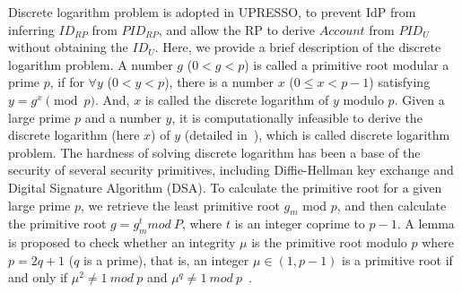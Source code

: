 Discrete logarithm problem is adopted in UPRESSO, to prevent IdP from inferring $ID_{RP}$ from $PID_{RP}$, and allow the RP to derive $Account$ from $PID_U$ without obtaining the $ID_U$.
Here, we provide a brief description of the discrete logarithm problem.
A number $g$ ($0<g<p$) is called a primitive root modular a prime $p$, if for ${\forall}y$ ($0<y<p$), there is a  number $x$ ($0\le x <p-1$) satisfying $y=g^x \pmod p$.
And, $x$ is called the discrete logarithm of $y$ modulo $p$. Given a large prime $p$ and a number $y$, it is computationally infeasible to derive the discrete logarithm (here $x$) of $y$ (detailed in~\cite{WXWM}), which is called discrete logarithm problem. The hardness of solving discrete logarithm has been a base of the security of several security primitives, including Diffie-Hellman key exchange and Digital Signature Algorithm (DSA).
To calculate the primitive root for a given large prime $p$,  we retrieve the least primitive root $g_m$  mod $p$,
and then calculate the primitive root $g = g_{m}^{t} mod \ P$, where $t$ is an integer coprime to $p-1$.
A lemma is proposed to check whether an integrity $\mu$ is the primitive root modulo $p$ where $p=2q+1$ ($q$ is a prime), that is,  an integer $\mu \in (1, p-1)$ is a primitive root if and only if $\mu^2\neq 1 \ mod \ p$ and $\mu^q\neq 1 \ mod \ p$~\cite{Shoup,Wang}.






